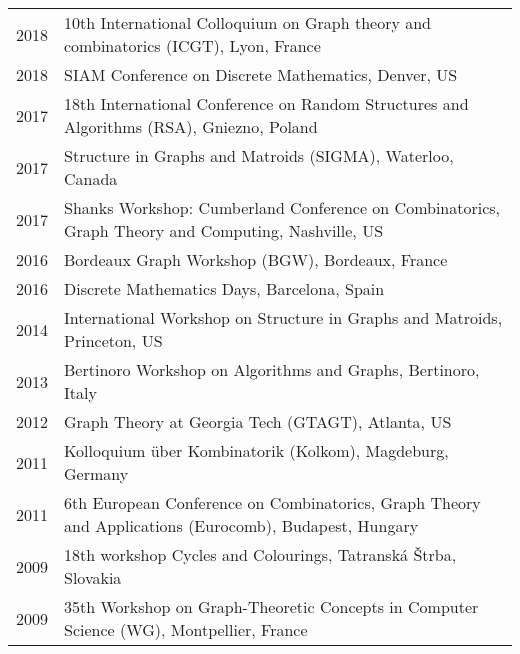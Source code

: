 \begin{small}
\noindent
\begin{tabular}{@{}p{1.5cm} @{\hspace{2mm}} p{16cm}}
2018 & 10th International Colloquium on Graph theory and combinatorics (ICGT), Lyon, France \\[0.1cm]
2018 & SIAM Conference on Discrete Mathematics, Denver, US \\[0.1cm]
2017 & 18th International Conference on Random Structures and Algorithms (RSA), Gniezno, Poland \\[0.1cm]
2017 & Structure in Graphs and Matroids (SIGMA), Waterloo, Canada\\[0.1cm]
2017 & Shanks Workshop: Cumberland Conference on Combinatorics, Graph Theory and Computing, Nashville, US\\[0.1cm]
2016 & Bordeaux Graph Workshop (BGW), Bordeaux, France\\[0.1cm]
2016 & Discrete Mathematics Days, Barcelona, Spain\\[0.1cm]
2014 & International Workshop on Structure in Graphs and Matroids, Princeton, US\\[0.1cm]
2013 & Bertinoro Workshop on Algorithms and Graphs, Bertinoro, Italy\\[0.1cm]
2012 & Graph Theory at Georgia Tech (GTAGT), Atlanta, US\\[0.1cm]
2011 & Kolloquium \"uber Kombinatorik (Kolkom), Magdeburg, Germany\\[0.1cm]
2011 & 6th European Conference on Combinatorics, Graph Theory and Applications (Eurocomb), Budapest, Hungary\\[0.1cm]
2009 & 18th workshop Cycles and Colourings, Tatransk\'a \v Strba, Slovakia\\[0.1cm]
2009 & 35th Workshop on Graph-Theoretic Concepts in Computer Science (WG), Montpellier, France\\[0.1cm]
\end{tabular}
\end{small}

